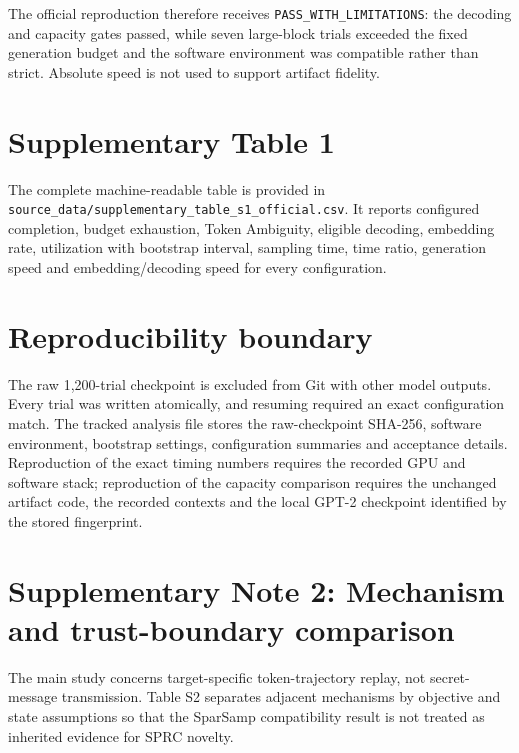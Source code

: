 \documentclass[11pt,a4paper]{article}
\begin{document}
The official reproduction therefore receives \texttt{PASS\_\allowbreak{}WITH\_\allowbreak{}LIMITATIONS}: the decoding and capacity gates passed, while seven large-block trials exceeded the fixed generation budget and the software environment was compatible rather than strict. Absolute speed is not used to support artifact fidelity.

\section*{Supplementary Table 1}
The complete machine-readable table is provided in \texttt{source\_\allowbreak{}data/\allowbreak{}supplementary\_\allowbreak{}table\_\allowbreak{}s1\_\allowbreak{}official.\allowbreak{}csv}. It reports configured completion, budget exhaustion, Token Ambiguity, eligible decoding, embedding rate, utilization with bootstrap interval, sampling time, time ratio, generation speed and embedding/decoding speed for every configuration.

\section*{Reproducibility boundary}
The raw 1,200-trial checkpoint is excluded from Git with other model outputs. Every trial was written atomically, and resuming required an exact configuration match. The tracked analysis file stores the raw-checkpoint SHA-256, software environment, bootstrap settings, configuration summaries and acceptance details. Reproduction of the exact timing numbers requires the recorded GPU and software stack; reproduction of the capacity comparison requires the unchanged artifact code, the recorded contexts and the local GPT-2 checkpoint identified by the stored fingerprint.

\section*{Supplementary Note 2: Mechanism and trust-boundary comparison}
The main study concerns target-specific token-trajectory replay, not secret-message transmission. Table S2 separates adjacent mechanisms by objective and state assumptions so that the SparSamp compatibility result is not treated as inherited evidence for SPRC novelty.
\end{document}
